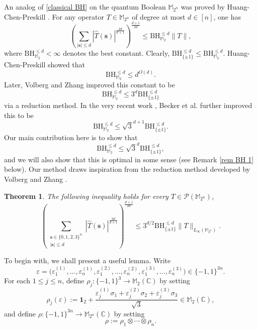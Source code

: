 \documentclass{amsbook}
\newtheorem{theorem}{Theorem}[chapter]
\theoremstyle{definition}
\theoremstyle{remark}
\numberwithin{section}{chapter}
\numberwithin{equation}{chapter}
\newcommand{\M}{\mathbb{M}}
\newcommand{\1}{\mathbf{1}}
\newcommand{\s}{\mathbf{s}}
\begin{document}
An analog of \eqref{classical BH} on the quantum Boolean $\mathbb{M}_{2^n}$  was proved by Huang-Chen-Preskill \cite{HCP2023}. 
For any operator $T\in \mathbb{M}_{2^n}$ of degree at most $d\in [n]$, one has
\[
 \left( \sum_{|\mathbf{s}|\leq d} |\widehat{T}(\mathbf{s})|^{\frac{2d}{d+1}} \right)^{\frac{d+1}{2d}} \leq \mathrm{BH}_{\mathbb{M}_2}^{\leq d} \|T\|,
\]
where $\mathrm{BH}_{\mathbb{M}_2}^{\leq d} < \infty$ denotes the best constant.
Clearly, $\mathrm{BH}_{\{\pm1\}}^{\leq d} \leq \mathrm{BH}_{\M_2}^{\leq d}$. Huang-Chen-Preskill \cite{HCP2023} showed that 
$$\mathrm{BH}_{\mathbb{M}_2}^{\leq d}\leq d^{O(d)}.$$
Later, Volberg and Zhang \cite[Theorem 1.2]{VZ2024} improved this constant to be
\[
\mathrm{BH}_{\mathbb{M}_2}^{\leq d} \leq 3^d \mathrm{BH}_{\{\pm1\}}^{\leq d}
\]
via a reduction method. In the very recent work \cite{BSVZ2025}, Becker et al. further improved this to be 
\[
\mathrm{BH}_{\mathbb{M}_2}^{\leq d} \leq \sqrt{3}^{d+1} \mathrm{BH}_{\{\pm1\}}^{\leq d}.
\]
Our main contribution here is to show that 
\[
\mathrm{BH}_{\mathbb{M}_2}^{\leq d} \leq \sqrt{3}^{d} \mathrm{BH}_{\{\pm1\}}^{\leq d},
\]
and we will also show that this is optimal in some sense (see Remark \ref{rem BH 1} below). 
Our method draws inspiration from the reduction  method developed by Volberg and Zhang \cite{VZ2024}.

\begin{theorem}\label{Quantum BH}
The following inequality holds for every $T\in \mathcal{P}(\mathbb{M}_{2^n})$,
\[
\left(\sum_{\substack{\mathbf{s}\in\{0,1,2,3\}^{n}\\|\mathbf{s}|\leq d}}|\widehat{T}(\s)|^{\frac{2d}{d+1}}\right)^{\frac{d+1}{2d}}\leq 3^{d/2}\mathrm{BH}^{\leq d}_{\{\pm1\}}\|T\|_{L_{\infty}(\mathbb{M}_{2^n})}.
\]
\end{theorem}

To begin with, we shall present a useful lemma.  Write
	\[\varepsilon=
	\big(\varepsilon_1^{(1)},\dots,\varepsilon_n^{(1)},
	\varepsilon_1^{(2)},\dots,\varepsilon_n^{(2)},
	\varepsilon_1^{(3)},\dots,\varepsilon_n^{(3)}\big)\in\{-1,1\}^{3n}.
	\]
	For each \(1\le j\le n\), define $\rho_j: \{-1,1\}^{3} \to \M_2(\mathbb C)$ by setting
	\begin{equation}\label{rho-j}
		\rho_j(\varepsilon):=
		\mathbf{1}_2+\frac{\varepsilon_j^{(1)}\sigma_1+\varepsilon_j^{(2)}\sigma_2+\varepsilon_j^{(3)}\sigma_3}{\sqrt3}\in \M_2(\mathbb C),
	\end{equation}
and define $\rho: \{-1,1\}^{3n} \to \M_{2^n}(\mathbb C)$ by setting
	\begin{equation}\label{rho}
	\rho:=\rho_1\otimes\cdots\otimes \rho_n.
	\end{equation}
\end{document}
